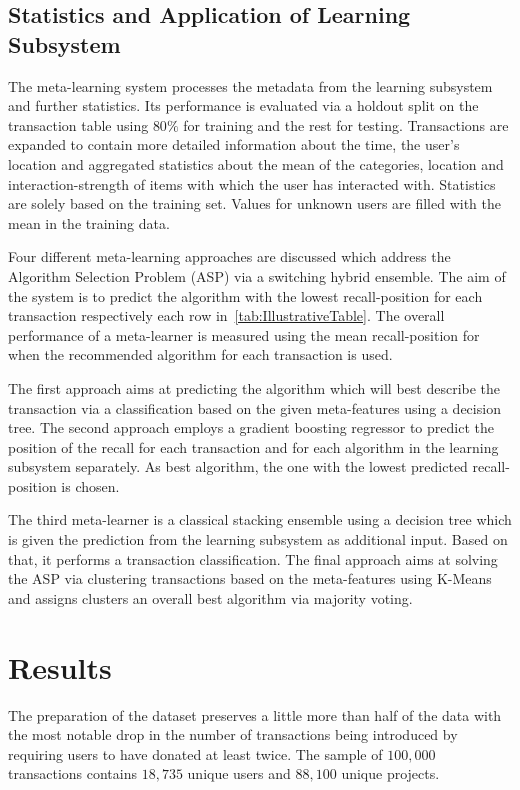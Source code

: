 \documentclass[runningheads]{llncs}
\begin{document}
\subsection{Statistics and Application of Learning Subsystem}
The meta-learning system processes the metadata from the learning subsystem and further statistics. Its performance is evaluated via a holdout split on the transaction table using $80\%$ for training and the rest for testing. Transactions are expanded to contain more detailed information about the time, the user's location and aggregated statistics about the mean of the categories, location and interaction-strength of items with which the user has interacted with. Statistics are solely based on the training set. Values for unknown users are filled with the mean in the training data.

Four different meta-learning approaches are discussed which address the Algorithm Selection Problem (ASP) via a switching hybrid ensemble. The aim of the system is to predict the algorithm with the lowest recall-position for each transaction respectively each row in~\autoref{tab:IllustrativeTable}. The overall performance of a meta-learner is measured using the mean recall-position for when the recommended algorithm for each transaction is used.

The first approach aims at predicting the algorithm which will best describe the transaction via a classification based on the given meta-features using a decision tree. The second approach employs a gradient boosting regressor to predict the position of the recall for each transaction and for each algorithm in the learning subsystem separately. As best algorithm, the one with the lowest predicted recall-position is chosen.

The third meta-learner is a classical stacking ensemble using a decision tree which is given the prediction from the learning subsystem as additional input. Based on that, it performs a transaction classification. The final approach aims at solving the ASP via clustering transactions based on the meta-features using K-Means and assigns clusters an overall best algorithm via majority voting.

\section{Results}
The preparation of the dataset preserves a little more than half of the data with the most notable drop in the number of transactions being introduced by requiring users to have donated at least twice. The sample of $100,000$ transactions contains $18,735$ unique users and $88,100$ unique projects.
\end{document}
